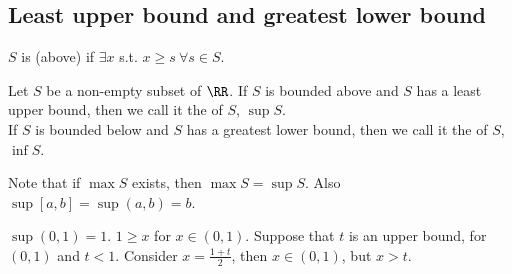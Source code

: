 \documentclass[11pt]{scrartcl}
\numberwithin{equation}{section}
\begin{document}
\subsection{Least upper bound and greatest lower bound}
\begin{definition}
    $S$ is  (above) if $\exists x$ s.t. $x\geq s \ \forall s \in S$.
\end{definition}
\begin{definition}
    Let $S$ be a non-empty subset of $\RR$.
    If $S$ is bounded above and $S$ has a least upper bound, then 
    we call it the  of $S$, $\sup{S}$. \\
    If $S$ is bounded below and $S$ has a greatest lower bound, then 
    we call it the  of $S$, $\inf{S}$.
\end{definition}
Note that if $\max S$ exists, then $\max S = \sup S$. Also $\sup[a,b] = \sup(a,b) = b$.
\begin{example}
    $\sup(0,1) = 1$. 
    $1 \geq x$ for $x \in (0,1)$. Suppose that $t$ is an upper bound, for 
    $(0,1)$ and $t<1$. Consider $x = \frac{1+t}{2}$, then $x \in (0,1)$,
    but $x>t$.
\end{example}
\end{document}
